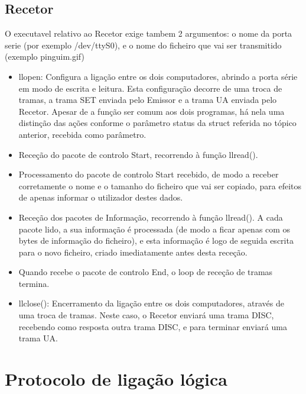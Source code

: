 \documentclass[article, a4paper, 11pt, oneside]{memoir}
\begin{document}
\section{Recetor}
O executavel relativo ao Recetor exige tambem 2 argumentos: o nome da porta serie (por exemplo /dev/ttyS0), e o nome do ficheiro que vai ser transmitido (exemplo pinguim.gif)
 
\begin{itemize}
 	\item llopen: Configura a ligação entre os dois computadores, abrindo a porta série em modo de escrita e leitura. Esta configuração decorre de uma troca de tramas, a trama SET enviada pelo Emissor e a trama UA enviada pelo Recetor. Apesar de a função ser comum aos dois programas, há nela uma distinção das ações conforme o parâmetro status da struct referida no tópico anterior, recebida como parâmetro.
 	\item Receção do pacote de controlo Start, recorrendo à função llread().
 	\item Processamento do pacote de controlo Start recebido, de modo a receber corretamente o nome e o tamanho do ficheiro que vai ser copiado, para efeitos de apenas informar o utilizador destes dados.
 	\item Receção dos pacotes de Informação, recorrendo à função llread(). A cada pacote lido, a sua informação é processada (de modo a ficar apenas com os bytes de informação do ficheiro), e esta informação é logo de seguida escrita para o novo ficheiro, criado imediatamente antes desta receção.
 	\item Quando recebe o pacote de controlo End, o loop de receção de tramas termina.
 	\item llclose(): Encerramento da ligação entre os dois computadores, através de uma troca de tramas. Neste caso, o Recetor enviará uma trama DISC, recebendo como resposta outra trama DISC, e para terminar enviará uma trama UA.
\end{itemize}

\chapter[Protocolo de ligação lógica][Protocolo de ligação lógica]{Protocolo de ligação lógica} \label{\thechapter}
\end{document}

